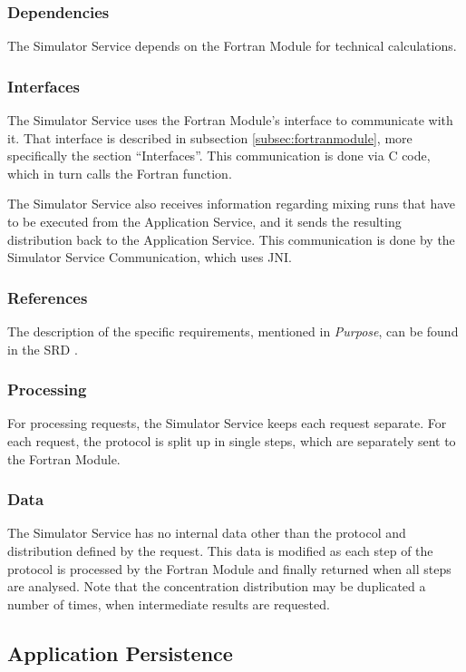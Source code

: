 \subsubsection*{Dependencies}
The Simulator Service depends on the Fortran Module for technical calculations.

\subsubsection*{Interfaces}
The Simulator Service uses the Fortran Module's interface to communicate with it. That interface is described in subsection \ref{subsec:fortranmodule}, more specifically the section ``Interfaces''. This communication is done via C code, which in turn calls the Fortran function.

The Simulator Service also receives information regarding mixing runs that have to be executed from the Application Service, and it sends the resulting distribution back to the Application Service. This communication is done by the Simulator Service Communication, which uses JNI.

\subsubsection*{References}
The description of the specific requirements, mentioned in \emph{Purpose}, can be found in the SRD \cite{srd}.

\subsubsection*{Processing}
For processing requests, the Simulator Service keeps each request separate. For each request, the protocol is split up in single steps, which are separately sent to the Fortran Module.

\subsubsection*{Data}
The Simulator Service has no internal data other than the protocol and distribution defined by the request. This data is modified as each step of the protocol is processed by the Fortran Module and finally returned when all steps are analysed. Note that the concentration distribution may be duplicated a number of times, when intermediate results are requested.

\subsection{Application Persistence}
\label{subsec:apppersistence}

